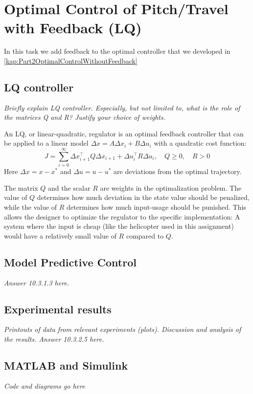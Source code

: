 \documentclass[../main.tex]{subfiles}
\begin{document}
\section{Optimal Control of Pitch/Travel with Feedback (LQ)}
In this task we add feedback to the optimal controller that we developed in \cref{kap:Part2OptimalControlWithoutFeedback}

\subsection{LQ controller}
\textit{Briefly explain LQ controller. Especially, but not limited to, what is the role of the matrices Q and R? Justify your choice of weights.}

An LQ, or linear-quadratic, regulator is an optimal feedback controller that can be applied to a linear model $\Delta x=A\Delta x_i + B \Delta u_i$ with a quadratic cost function:
\begin{equation}
    J = \sum^\infty_{i=0} \Delta x_{i+1}^\top Q \Delta x_{i+1} + \Delta u_i^\top R \Delta u_i, \quad Q \ge0, \quad R > 0
\end{equation}
Here $ \Delta x = x - x^*$ and $\Delta u = u - u^*$ are deviations from the optimal trajectory.

The matrix $Q$ and the scalar $R$ are weights in the optimalization problem. The value of $Q$ determines how much deviation in the state value should be penalized, while the value of $R$ determines how much input-usage should be punished. This allows the designer to optimize the regulator to the specific implementation: A system where the input is cheap (like the helicopter used in this assignment) would have a relatively small value of $R$ compared to $Q$.

\subsection{Model Predictive Control}
\textit{Answer 10.3.1.3 here.}

\subsection{Experimental results}
\textit{Printouts of data from relevant experiments (plots).
Discussion and analysis of the results.
Answer 10.3.2.5 here.}

\subsection{MATLAB and Simulink}
\textit{Code and diagrams go here}
\end{document}
